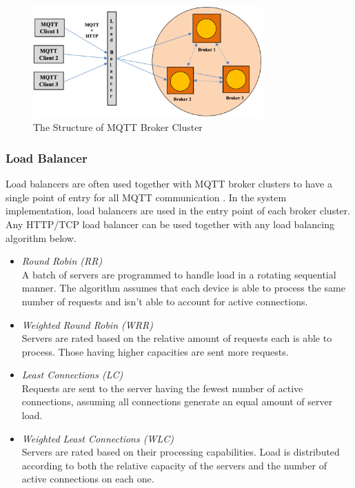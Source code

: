 \documentclass[conference]{IEEEtran}
\begin{document}
\begin{figure}[htbp]
\centering
\includegraphics[width=250pt]{loadbalancer.png}
\caption{The Structure of MQTT Broker Cluster}
\label{loadbalancer}
\end{figure}

\subsubsection{Load Balancer}

Load balancers are often used together with MQTT broker clusters to have a single point of entry for all MQTT communication \cite{b16}. In the system implementation, load balancers are used in the entry point of each broker cluster. Any HTTP/TCP load balancer can be used together with any load balancing algorithm below.

\begin{itemize}
		\item \textit{Round Robin (RR)}\\
		A batch of servers are programmed to handle load in a rotating sequential manner. The algorithm assumes that each device is able to process the same number of requests and isn’t able to account for active connections.

		\item \textit{Weighted Round Robin (WRR)}\\
		Servers are rated based on the relative amount of requests each is able to process. Those having higher capacities are sent more requests.

		\item \textit{Least Connections (LC)}\\
		Requests are sent to the server having the fewest number of active connections, assuming all connections generate an equal amount of server load.

		\item \textit{Weighted Least Connections (WLC)}\\
		Servers are rated based on their processing capabilities. Load is distributed according to both the relative capacity of the servers and the number of active connections on each one.
	
	\end{itemize}
\end{document}
